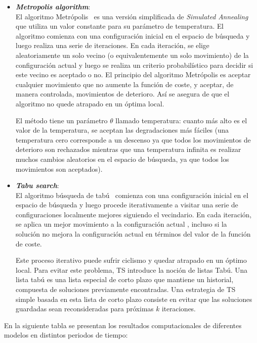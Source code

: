 \documentclass[letter, 10pt]{article}
\begin{document}
\begin{itemize}
 \item \textbf{\textit{Metropolis algorithm}}: \\
 El algoritmo Metrópolis~\cite{Herman2010SimulatedA} es una versión simplificada de \textit{Simulated Annealing}~\cite{Herman2010SimulatedA} que utiliza un valor constante para su parámetro de temperatura. El algoritmo comienza con una configuración inicial en el espacio de búsqueda y luego realiza una serie de iteraciones. En cada iteración, se elige aleatoriamente un solo vecino (o equivalentemente un solo movimiento) de la configuración actual y luego se realiza un criterio probabilístico para decidir si este vecino es aceptado o no. El principio del algoritmo Metrópolis es aceptar cualquier movimiento que no aumente la función de coste, y aceptar, de manera controlada, movimientos de deterioro. Así se asegura de que el algoritmo no quede atrapado en un óptima local.
 
El método tiene un parámetro $\theta$ llamado temperatura: cuanto más alto es el valor de la temperatura, se aceptan las degradaciones más fáciles (una temperatura cero corresponde a un descenso ya que todos los movimientos de deterioro son rechazados mientras que una temperatura infinita es realizar muchos cambios aleatorios en el espacio de búsqueda, ya que todos los movimientos son aceptados).

\item \textbf{\textit{Tabu search}}: \\
El algoritmo búsqueda de tabú~\cite{Glover:1997:TS:549765} comienza con una configuración inicial en el espacio de búsqueda y luego procede iterativamente a visitar una serie de configuraciones localmente mejores siguiendo el vecindario. En cada iteración, se aplica un mejor movimiento a la configuración actual , incluso si la solución no mejora la configuración actual en términos del valor de la función de coste. 

Este proceso iterativo puede sufrir ciclismo y quedar atrapado en un óptimo local. Para evitar este problema, TS introduce la noción de listas Tabú. Una lista tabú es una lista especial de corto plazo que mantiene un historial, compuesta de soluciones previamente encontradas. Una estrategia de TS simple basada en esta lista de corto plazo consiste en evitar que las soluciones guardadas sean reconsideradas para próximas $k$ iteraciones. \end{itemize}

En la siguiente tabla se presentan los resultados computacionales de diferentes modelos en distintos periodos de tiempo:
\end{document}

